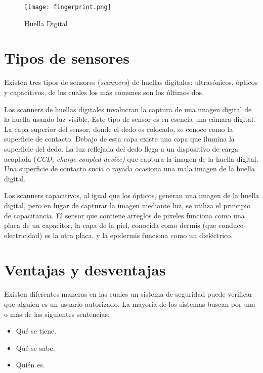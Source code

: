\begin{figure}[htb]
 \begin{center}
  \texttt{[image: fingerprint.png]}
 \end{center}
 \caption{Huella Digital}
 \label{fig:finger_print_1}
\end{figure}


\section{Tipos de sensores}
\label{sec:fp_sensores}


Existen tres tipos de sensores (\textit{scanners}) de huellas digitales: ultrasónicos, ópticos y capacitivos, de los cuales los más comunes son los últimos dos.

Los scanners de huellas digitales involucran la captura de una imagen digital de la huella usando luz visible. Este tipo de sensor es en esencia una cámara digital. La capa superior del sensor, donde el dedo es colocado, se conoce como la superficie de contacto. Debajo de esta capa existe una capa que ilumina la superficie del dedo. La luz reflejada del dedo llega a un dispositivo de carga acoplada (\textit{CCD, charge-coupled device)} que captura la imagen de la huella digital. Una superficie de contacto sucia o rayada ocasiona una mala imagen de la huella digital.

Los scanners capacitivos, al igual que los ópticos, generan una imagen de la huella digital, pero en lugar de capturar la imagen mediante luz, se utiliza el principio de capacitancia. El sensor que contiene arreglos de pixeles funciona como una placa de un capacitor, la  capa de la piel, conocida como dermis (que conduce electricidad) es la otra placa, y la epidermis funciona como un dieléctrico.

\section{Ventajas y desventajas}
\label{sec:fp_pros_cons}

Existen diferentes maneras en las cuales un sistema de seguridad puede verificar que alguien es un usuario autorizado. La mayoría de los sistemas buscan por una o más de las siguientes sentencias:

\begin{itemize}
 \item Qué se tiene.
 \item Qué se sabe.
 \item Quién es.
\end{itemize}

